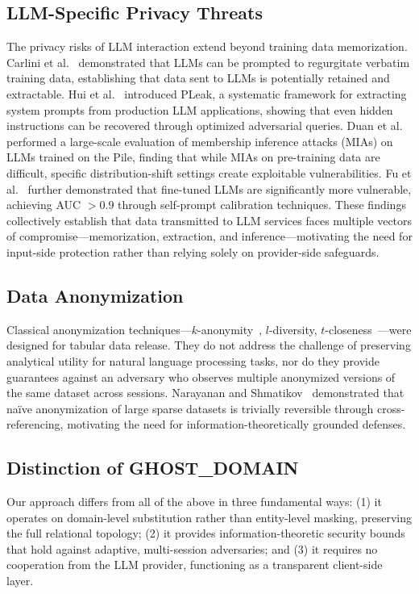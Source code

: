 \documentclass[11pt]{article}
\begin{document}
\subsection{LLM-Specific Privacy Threats}
The privacy risks of LLM interaction extend beyond training data memorization. Carlini et al.~\cite{carlini2021extracting} demonstrated that LLMs can be prompted to regurgitate verbatim training data, establishing that data sent to LLMs is potentially retained and extractable. Hui et al.~\cite{hui2024pleak} introduced PLeak, a systematic framework for extracting system prompts from production LLM applications, showing that even hidden instructions can be recovered through optimized adversarial queries. Duan et al.~\cite{duan2024membership} performed a large-scale evaluation of membership inference attacks (MIAs) on LLMs trained on the Pile, finding that while MIAs on pre-training data are difficult, specific distribution-shift settings create exploitable vulnerabilities. Fu et al.~\cite{fu2024membership} further demonstrated that fine-tuned LLMs are significantly more vulnerable, achieving AUC $> 0.9$ through self-prompt calibration techniques. These findings collectively establish that data transmitted to LLM services faces multiple vectors of compromise---memorization, extraction, and inference---motivating the need for input-side protection rather than relying solely on provider-side safeguards.

\subsection{Data Anonymization}
Classical anonymization techniques---$k$-anonymity~\cite{sweeney2002kanonymity}, $l$-diversity, $t$-closeness~\cite{li2007tcloseness}---were designed for tabular data release. They do not address the challenge of preserving analytical utility for natural language processing tasks, nor do they provide guarantees against an adversary who observes multiple anonymized versions of the same dataset across sessions. Narayanan and Shmatikov~\cite{narayanan2008robust} demonstrated that na\"ive anonymization of large sparse datasets is trivially reversible through cross-referencing, motivating the need for information-theoretically grounded defenses.

\subsection{Distinction of GHOST\_DOMAIN}
Our approach differs from all of the above in three fundamental ways: (1) it operates on domain-level substitution rather than entity-level masking, preserving the full relational topology; (2) it provides information-theoretic security bounds that hold against adaptive, multi-session adversaries; and (3) it requires no cooperation from the LLM provider, functioning as a transparent client-side layer.
\end{document}
